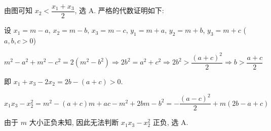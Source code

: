\begin{solutions}
\begin{tikzpicture}[line cap=round,line join=round,scale=0.6]
\end{tikzpicture}

由图可知 $x_2<\dfrac{x_1+x_3}{2}$, 选 A. 严格的代数证明如下:

设 $x_1=m-a$, $x_2=m-b$, $x_3=m-c$, $y_1=m+a$, $y_2=m+b$, $y_3=m+c$ ($a,b,c>0$)

$m^2-a^2+m^2-c^2=2(m^2-b^2)\Rightarrow 2b^2=a^2+c^2\Rightarrow 2b^2>\dfrac{(a+c)^2}{2}\Rightarrow b>\dfrac{a+c}{2}$

即 $x_1+x_3-2x_2=2b-(a+c)>0$.

$x_1x_3-x_2^2=m^2-(a+c)m+ac-m^2+2bm-b^2=-\dfrac{(a-c)^2}{2}+m(2b-a+c)$

由于 $m$ 大小正负未知, 因此无法判断 $x_1x_3-x_2^2$ 正负, 选 A.
\end{solutions}